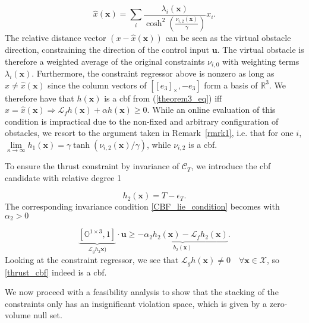 \small
\begin{equation}
    \hat{x}(\mathbf{x}) =  \sum_i \frac{\lambda_i(\mathbf{x})}{\cosh^2(\frac{\nu_{i,2}(\mathbf{x})}{\gamma})} x_i.
\end{equation}
\normalsize
The relative distance vector $(x- \hat{x}(\mathbf{x}))$ can be seen as the virtual obstacle direction, constraining the direction of the control input $\mathbf{u}$.
The virtual obstacle is therefore a weighted average of the original constraints $\nu_{i,0}$
with weighting terms $\lambda_i (\mathbf{x})$. Furthermore, the constraint regressor above is nonzero as long as $x \neq \hat{x}(\mathbf{x})$ since the column vectors of $ [[e_3]_\times, - e_3]$ form a basis of $\mathbb{R}^3$. We therefore have that $h(\mathbf{x})$ is a \ac{cbf} from (\ref{theorem3_eq}) iff $x = \hat{x}(\mathbf{x}) \Longrightarrow \mathcal{L}_f h(\mathbf{x}) + \alpha  h(\mathbf{x}) \geq 0$. While an online evaluation of this condition is impractical due to the non-fixed and arbitrary configuration of obstacles, we resort to the argument taken in Remark~\ref{rmrk1}, i.e. that for one $i$, $\underset{\kappa \rightarrow \infty}{\lim} h_1(\mathbf{x}) = \gamma \tanh({{ \nu_{i,2}(\mathbf{x})}/{\gamma}})$, while $\nu_{i,2}$ is a \ac{cbf}.

To ensure the thrust constraint by invariance of $\mathcal{C}_T$, we introduce the \ac{cbf} candidate with relative degree 1

\small
\begin{equation}\label{thrust_cbf}
    h_2(\mathbf{x}) = T - \epsilon_T.
\end{equation}
\normalsize
The corresponding invariance condition \eqref{CBF_lie_condition} becomes with  $\alpha_2 > 0$

\small
\begin{equation}\label{thrust_invariance}
     \underbrace{[\mathbb{O}^{1\times3}, 1]}_{\mathcal{L}_g h_2\mathbf{x})} \cdot \mathbf{u} \geq \underbrace{-\alpha_2 h_2 (\mathbf{x}) - \mathcal{L}_f h_2(\mathbf{x})}_{b_2(\mathbf{x})}.
\end{equation}
\normalsize
Looking at the constraint regressor, we see that $\mathcal{L}_g h(\mathbf{x})\neq 0 \quad \forall \mathbf{x} \in \mathcal{X}$, so \eqref{thrust_cbf} indeed is a \ac{cbf}.

We now proceed with a feasibility analysis to show that the stacking of the constraints only has an insignificant violation space, which is given by a zero-volume null set.



